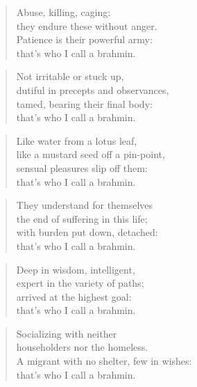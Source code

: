 \documentclass[12pt,openany]{book}%
\begin{document}
\begin{verse}%
Abuse, killing, caging: \\
they endure these without anger. \\
Patience is their powerful army: \\
that’s who I call a brahmin. 

%
\end{verse}

\begin{verse}%
Not irritable or stuck up, \\
dutiful in precepts and observances, \\
tamed, bearing their final body: \\
that’s who I call a brahmin. 

%
\end{verse}

\begin{verse}%
Like water from a lotus leaf, \\
like a mustard seed off a pin-point, \\
sensual pleasures slip off them: \\
that’s who I call a brahmin. 

%
\end{verse}

\begin{verse}%
They understand for themselves \\
the end of suffering in this life; \\
with burden put down, detached: \\
that’s who I call a brahmin. 

%
\end{verse}

\begin{verse}%
Deep in wisdom, intelligent, \\
expert in the variety of paths; \\
arrived at the highest goal: \\
that’s who I call a brahmin. 

%
\end{verse}

\begin{verse}%
Socializing with neither \\
householders nor the homeless. \\
A migrant with no shelter, few in wishes: \\
that’s who I call a brahmin. 

%
\end{verse}
\end{document}
